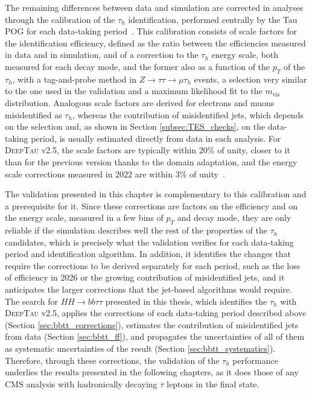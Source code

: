 The remaining differences between data and simulation are corrected in analyses through the calibration of the $\tau_h$ identification, performed centrally by the Tau POG for each data-taking period~\cite{CMS-TAU-24-001}. This calibration consists of scale factors for the identification efficiency, defined as the ratio between the efficiencies measured in data and in simulation, and of a correction to the $\tau_h$ energy scale, both measured for each decay mode, and the former also as a function of the $p_T$ of the $\tau_h$, with a tag-and-probe method in $Z\to\tau\tau\to\mu\tau_h$ events, a selection very similar to the one used in the validation and a maximum likelihood fit to the $m_\text{vis}$ distribution. Analogous scale factors are derived for electrons and muons misidentified as $\tau_h$, whereas the contribution of misidentified jets, which depends on the selection and, as shown in Section \ref{subsec:TES_checks}, on the data-taking period, is usually estimated directly from data in each analysis. For \textsc{DeepTau} v2.5, the scale factors are typically within $20\%$ of unity, closer to it than for the previous version thanks to the domain adaptation, and the energy scale corrections measured in 2022 are within $3\%$ of unity~\cite{CMS-TAU-24-001}.

The validation presented in this chapter is complementary to this calibration and a prerequisite for it. Since these corrections are factors on the efficiency and on the energy scale, measured in a few bins of $p_T$ and decay mode, they are only reliable if the simulation describes well the rest of the properties of the $\tau_h$ candidates, which is precisely what the validation verifies for each data-taking period and identification algorithm. In addition, it identifies the changes that require the corrections to be derived separately for each period, such as the loss of efficiency in 2026 or the growing contribution of misidentified jets, and it anticipates the larger corrections that the jet-based algorithms would require. The search for $HH\to bb\tau\tau$ presented in this thesis, which identifies the $\tau_h$ with \textsc{DeepTau} v2.5, applies the corrections of each data-taking period described above (Section \ref{sec:bbtt_corrections}), estimates the contribution of misidentified jets from data (Section \ref{sec:bbtt_ff}), and propagates the uncertainties of all of them as systematic uncertainties of the result (Section \ref{sec:bbtt_systematics}). Therefore, through these corrections, the validation of the $\tau_h$ performance underlies the results presented in the following chapters, as it does those of any CMS analysis with hadronically decaying $\tau$ leptons in the final state.







